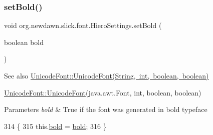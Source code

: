 \mbox{\label{classorg_1_1newdawn_1_1slick_1_1font_1_1_hiero_settings_a19fa5a2d6ec86cc6d74149d74330d502}} 
\subsubsection{\texorpdfstring{set\+Bold()}{setBold()}}
{\footnotesize\ttfamily void org.\+newdawn.\+slick.\+font.\+Hiero\+Settings.\+set\+Bold (\begin{DoxyParamCaption}\item[{boolean}]{bold }\end{DoxyParamCaption})\hspace{0.3cm}{\ttfamily [inline]}}

\begin{DoxySeeAlso}{See also}
\mbox{\hyperlink{classorg_1_1newdawn_1_1slick_1_1_unicode_font_a45cb814b2f8c0ec1e8dbc92c4594b33f}{Unicode\+Font\+::\+Unicode\+Font(\+String, int, boolean, boolean)}} 

\mbox{\hyperlink{classorg_1_1newdawn_1_1slick_1_1_unicode_font_acb84ea3da65e6ac55ce2283bc71e41cf}{Unicode\+Font\+::\+Unicode\+Font}}(java.\+awt.\+Font, int, boolean, boolean)
\end{DoxySeeAlso}

\begin{DoxyParams}{Parameters}
{\em bold} & True if the font was generated in bold typeface \\
\hline
\end{DoxyParams}

\begin{DoxyCode}
314                                        \{
315         this.\mbox{\hyperlink{classorg_1_1newdawn_1_1slick_1_1font_1_1_hiero_settings_a836242ef5a8edc24a2b5b8c85f9160eb}{bold}} = \mbox{\hyperlink{classorg_1_1newdawn_1_1slick_1_1font_1_1_hiero_settings_a836242ef5a8edc24a2b5b8c85f9160eb}{bold}};
316     \}
\end{DoxyCode}
\mbox{\label{classorg_1_1newdawn_1_1slick_1_1font_1_1_hiero_settings_aa847c17437b73f9b918edc601baf9ba7}} 

